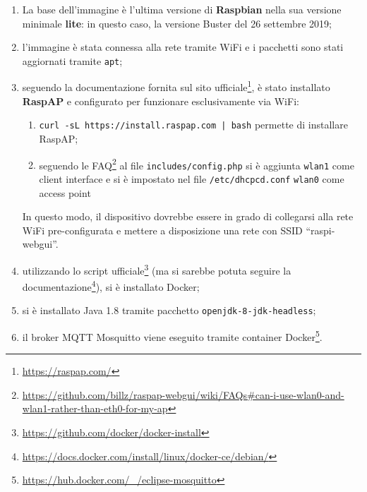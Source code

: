 \begin{appendix}
  \begin{enumerate}
    \item
      La base dell'immagine è l'ultima versione di \textbf{Raspbian} nella sua versione minimale \textbf{lite}:
      in questo caso, la versione Buster del 26 settembre 2019;
    \item
      l'immagine è stata connessa alla rete tramite WiFi e i pacchetti sono stati aggiornati tramite \texttt{apt};
    \item
      seguendo la documentazione fornita sul sito ufficiale\footnote{\url{https://raspap.com/}},
      è stato installato \textbf{RaspAP} e configurato per funzionare esclusivamente via WiFi:
      \begin{enumerate}
        \item
          \texttt{curl -sL https://install.raspap.com | bash} permette di installare RaspAP\@;
        \item
          seguendo le FAQ\footnote{\url{https://github.com/billz/raspap-webgui/wiki/FAQs\#can-i-use-wlan0-and-wlan1-rather-than-eth0-for-my-ap}}
          al file \texttt{includes/config.php} si è aggiunta \texttt{wlan1} come client interface e si è impostato nel file \texttt{/etc/dhcpcd.conf}
          \texttt{wlan0} come access point
      \end{enumerate}
      In questo modo, il dispositivo dovrebbe essere in grado di collegarsi alla rete WiFi pre-configurata e mettere a disposizione una rete con SSID ``raspi-webgui''.
    \item
      utilizzando lo script ufficiale\footnote{\url{https://github.com/docker/docker-install}}
      (ma si sarebbe potuta seguire la documentazione\footnote{\url{https://docs.docker.com/install/linux/docker-ce/debian/}}), si è installato Docker;
    \item
      si è installato Java 1.8 tramite pacchetto \texttt{openjdk-8-jdk-headless};
    \item
      il broker MQTT Mosquitto viene eseguito tramite container Docker\footnote{\url{https://hub.docker.com/_/eclipse-mosquitto}}.
  \end{enumerate}
\end{appendix}
